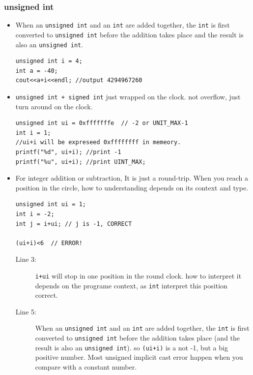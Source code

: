 \documentclass[a4paper,11pt,twoside]{book}
\begin{document}
\subsubsection{unsigned int}
\begin{itemize}

    \item When an \texttt{unsigned int} and an \texttt{int} are added together, the \texttt{int} is first converted to \texttt{unsigned int} before the addition takes place and the result is also an \texttt{unsigned int}.
\begin{lstlisting}[]
unsigned int i = 4;
int a = -40;
cout<<a+i<<endl; //output 4294967260
\end{lstlisting}

	\item \texttt{unsigned int + signed int} just wrapped on the clock. not overflow, just turn around on the clock. 
	
\begin{lstlisting}[numbers=none]
unsigned int ui = 0xfffffffe  // -2 or UNIT_MAX-1
int i = 1;
//ui+i will be expreseed 0xffffffff in memeory. 
printf("%d", ui+i); //print -1
printf("%u", ui+i); //print UINT_MAX;
\end{lstlisting}

	\item For integer addition or subtraction, It is just a round-trip. When you reach a position in the circle, how to understanding depends on its context and type.
\begin{lstlisting}
unsigned int ui = 1;
int i = -2;
int j = i+ui; // j is -1, CORRECT

(ui+i)<6  // ERROR!
\end{lstlisting}

\begin{description}
	\item[Line 3:] \texttt{i+ui} will stop in one position in the round clock. how to interpret it depends on the programe context, as \texttt{int} interpret this position correct.

	\item[Line 5:]  When an \texttt{unsigned int} and an \texttt{int} are added together, the \texttt{int} is first converted to \texttt{unsigned int} before the addition takes place (and the result is also an \texttt{unsigned int}). so \texttt{(ui+i)} is a not -1, but a big positive number. Most unsigned implicit cast error happen when you compare with a constant number.
\end{description}
	

\end{itemize}
\end{document}
